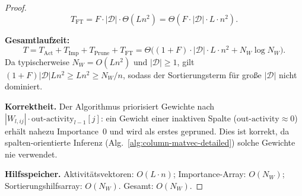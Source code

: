\documentclass[a4paper,12pt]{report}
\theoremstyle{definition}
\begin{document}
\begin{proof}
		\[
			T_{\mathrm{FT}} = F \cdot |\mathcal{D}| \cdot \Theta(L n^2) = \Theta(F \cdot |\mathcal{D}| \cdot L \cdot n^2).
		\]

		\textbf{Gesamtlaufzeit:}
		\[
			T = T_{\mathrm{Act}} + T_{\mathrm{Imp}} + T_{\mathrm{Prune}} + T_{\mathrm{FT}}
			= \Theta\!\bigl((1+F) \cdot |\mathcal{D}| \cdot L \cdot n^2 + N_W \log N_W\bigr).
		\]
		Da typischerweise $N_W = O(L n^2)$ und $|\mathcal{D}| \geq 1$, gilt $(1+F)|\mathcal{D}| L n^2 \geq L n^2 \geq N_W / n$, sodass der Sortierungsterm für große $|\mathcal{D}|$ nicht dominiert.

		\textbf{Korrektheit.} Der Algorithmus priorisiert Gewichte nach $|W_{l,ij}| \cdot \mathrm{out\text{-}activity}_{l-1}[j]$: ein Gewicht einer inaktiven Spalte ($\mathrm{out\text{-}activity} \approx 0$) erhält nahezu Importance~$0$ und wird als erstes gepruned. Dies ist korrekt, da spalten-orientierte Inferenz (Alg.~\ref{alg:column-matvec-detailed}) solche Gewichte nie verwendet.

		\textbf{Hilfsspeicher.} Aktivitätsvektoren: $O(L \cdot n)$; Importance-Array: $O(N_W)$; Sortierungshilfsarray: $O(N_W)$. Gesamt: $O(N_W)$.
	\end{proof}
\end{document}
